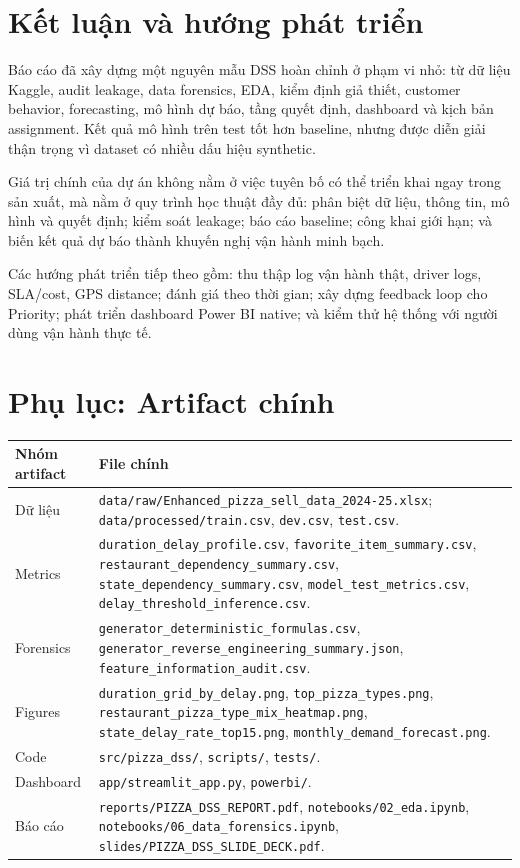\documentclass[12pt,a4paper,oneside]{report}
\newcommand{\code}[1]{\nolinkurl{#1}}
\begin{document}
\chapter{Kết luận và hướng phát triển}

Báo cáo đã xây dựng một nguyên mẫu DSS hoàn chỉnh ở phạm vi nhỏ: từ dữ liệu
Kaggle, audit leakage, data forensics, EDA, kiểm định giả thiết, customer
behavior, forecasting, mô hình dự báo, tầng quyết định, dashboard và kịch bản
assignment. Kết quả mô hình trên test tốt hơn baseline, nhưng được diễn giải
thận trọng vì dataset có nhiều dấu hiệu synthetic.

Giá trị chính của dự án không nằm ở việc tuyên bố có thể triển khai ngay trong
sản xuất, mà nằm ở quy trình học thuật đầy đủ: phân biệt dữ liệu, thông tin,
mô hình và quyết định; kiểm soát leakage; báo cáo baseline; công khai giới hạn;
và biến kết quả dự báo thành khuyến nghị vận hành minh bạch.

Các hướng phát triển tiếp theo gồm: thu thập log vận hành thật, driver logs,
SLA/cost, GPS distance; đánh giá theo thời gian; xây dựng feedback loop cho
Priority; phát triển dashboard Power BI native; và kiểm thử hệ thống với người
dùng vận hành thực tế.

\appendix
\chapter{Phụ lục: Artifact chính}

\begin{longtable}{p{4.2cm}p{9.8cm}}
\toprule
Nhóm artifact & File chính\\
\midrule
Dữ liệu & \code{data/raw/Enhanced\_pizza\_sell\_data\_2024-25.xlsx};
\code{data/processed/train.csv}, \code{dev.csv}, \code{test.csv}.\\
Metrics & \code{duration\_delay\_profile.csv}, \code{favorite\_item\_summary.csv},
\code{restaurant\_dependency\_summary.csv}, \code{state\_dependency\_summary.csv},
\code{model\_test\_metrics.csv}, \code{delay\_threshold\_inference.csv}.\\
Forensics & \code{generator\_deterministic\_formulas.csv},
\code{generator\_reverse\_engineering\_summary.json},
\code{feature\_information\_audit.csv}.\\
Figures & \code{duration\_grid\_by\_delay.png}, \code{top\_pizza\_types.png},
\code{restaurant\_pizza\_type\_mix\_heatmap.png},
\code{state\_delay\_rate\_top15.png}, \code{monthly\_demand\_forecast.png}.\\
Code & \code{src/pizza\_dss/}, \code{scripts/}, \code{tests/}.\\
Dashboard & \code{app/streamlit\_app.py}, \code{powerbi/}.\\
Báo cáo & \code{reports/PIZZA\_DSS\_REPORT.pdf},
\code{notebooks/02\_eda.ipynb}, \code{notebooks/06\_data\_forensics.ipynb},
\code{slides/PIZZA\_DSS\_SLIDE\_DECK.pdf}.\\
\bottomrule
\end{longtable}
\end{document}
